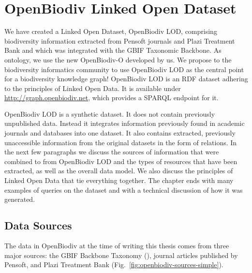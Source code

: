\chapter{OpenBiodiv Linked Open Dataset}
\label{chapter-lod}

We have created a Linked Open Dataset, OpenBiodiv LOD, comprising biodiversity information extracted from Pensoft journals and Plazi Treatment Bank and which was integrated with the GBIF Taxonomic Backbone. As ontology, we use the new \mbox{OpenBiodiv-O} developed by us. We propose to the biodiversity informatics community to use OpenBiodiv LOD as the central point for a biodiversity knowledge graph! OpenBiodiv LOD is an RDF dataset adhering to the principles of Linked Open Data. It is available under \url{http://graph.openbiodiv.net}, which provides a SPARQL endpoint for it.

OpenBiodiv LOD is a synthetic dataset. It does not contain previously unpublished data. Instead it integrates information previously found in academic journals and databases into one dataset. It also contains  extracted, previously unaccessible information from the original datasets in the form of relations. In the next few paragraphs we discuss the sources of information that were combined to from OpenBiodiv LOD and the types of resources that have been extracted, as well as the overall data model. We also discuss the principles of Linked Open Data that tie everything together. The chapter ends with many examples of queries on the dataset and with a technical discussion of how it was generated.

\section{Data Sources}

The data in OpenBiodiv at the time of writing this thesis comes from three major sources: the GBIF Backbone Taxonomy (\cite{gbif_secretariat_gbif_2017-1}), journal articles published by Pensoft, and Plazi Treatment Bank (Fig.~\ref{fig:openbiodiv-sources-simple}).

